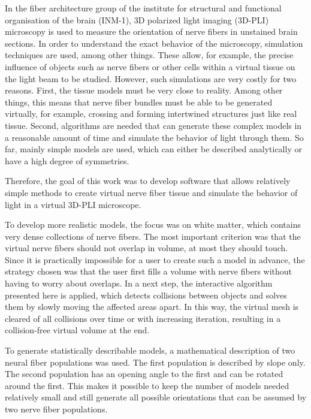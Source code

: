 %
% 
In the fiber architecture group of the institute for structural and functional organisation of the brain (INM-1), 3D polarized light imaging (3D-PLI) microscopy is used to measure the orientation of nerve fibers in unstained brain sections.
In order to understand the exact behavior of the microscopy, simulation techniques are used, among other things.
These allow, for example, the precise influence of objects such as nerve fibers or other cells within a virtual tissue on the light beam to be studied.
However, such simulations are very costly for two reasons.
First, the tissue models must be very close to reality.
Among other things, this means that nerve fiber bundles must be able to be generated virtually, for example, crossing and forming intertwined structures just like real tissue.
Second, algorithms are needed that can generate these complex models in a reasonable amount of time and simulate the behavior of light through them.
So far, mainly simple models are used, which can either be described analytically or have a high degree of symmetries.

Therefore, the goal of this work was to develop software that allows relatively simple methods to create virtual nerve fiber tissue and simulate the behavior of light in a virtual 3D-PLI microscope.

To develop more realistic models, the focus was on white matter, which contains very dense collections of nerve fibers.
The most important criterion was that the virtual nerve fibers should not overlap in volume, at most they should touch.
Since it is practically impossible for a user to create such a model in advance, the strategy chosen was that the user first fills a volume with nerve fibers without having to worry about overlaps.
In a next step, the interactive algorithm presented here is applied, which detects collisions between objects and solves them by slowly moving the affected areas apart.
In this way, the virtual mesh is cleared of all collisions over time or with increasing iteration, resulting in a collision-free virtual volume at the end.

To generate statistically describable models, a mathematical description of two neural fiber populations was used.
The first population is described by slope only.
The second population has an opening angle to the first and can be rotated around the first.
This makes it possible to keep the number of models needed relatively small and still generate all possible orientations that can be assumed by two nerve fiber populations.

